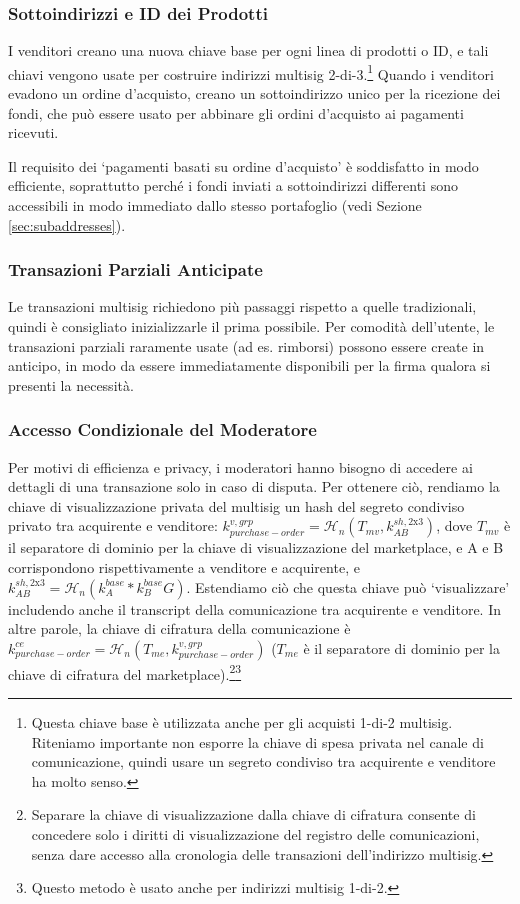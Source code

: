 \subsubsection*{Sottoindirizzi e ID dei Prodotti}

I venditori creano una nuova chiave base per ogni linea di prodotti o ID, e tali chiavi vengono usate per costruire indirizzi multisig 2-di-3.\footnote{Questa chiave base è utilizzata anche per gli acquisti 1-di-2 multisig. Riteniamo importante non esporre la chiave di spesa privata nel canale di comunicazione, quindi usare un segreto condiviso tra acquirente e venditore ha molto senso.} Quando i venditori evadono un ordine d'acquisto, creano un sottoindirizzo unico per la ricezione dei fondi, che può essere usato per abbinare gli ordini d'acquisto ai pagamenti ricevuti.

Il requisito dei `pagamenti basati su ordine d'acquisto' è soddisfatto in modo efficiente, soprattutto perché i fondi inviati a sottoindirizzi differenti sono accessibili in modo immediato dallo stesso portafoglio (vedi Sezione \ref{sec:subaddresses}).

\subsubsection*{Transazioni Parziali Anticipate}

Le transazioni multisig richiedono più passaggi rispetto a quelle tradizionali, quindi è consigliato inizializzarle il prima possibile. Per comodità dell'utente, le transazioni parziali raramente usate (ad es. rimborsi) possono essere create in anticipo, in modo da essere immediatamente disponibili per la firma qualora si presenti la necessità.

\subsubsection*{Accesso Condizionale del Moderatore}

Per motivi di efficienza e privacy, i moderatori hanno bisogno di accedere ai dettagli di una transazione solo in caso di disputa. Per ottenere ciò, rendiamo la chiave di visualizzazione privata del multisig un hash del segreto condiviso privato tra acquirente e venditore: $k^{v,grp}_{purchase-order} = \mathcal{H}_n(T_{mv},k^{sh,\textrm{2x3}}_{AB})$, dove $T_{mv}$ è il separatore di dominio per la chiave di visualizzazione del marketplace, e A e B corrispondono rispettivamente a venditore e acquirente, e $k^{sh,\textrm{2x3}}_{AB} = \mathcal{H}_n(k^{base}_{A}*k^{base}_{B} G)$. Estendiamo ciò che questa chiave può `visualizzare' includendo anche il transcript della comunicazione tra acquirente e venditore. In altre parole, la chiave di cifratura della comunicazione è $k^{ce}_{purchase-order} = \mathcal{H}_n(T_{me},k^{v,grp}_{purchase-order})$ ($T_{me}$ è il separatore di dominio per la chiave di cifratura del marketplace).\footnote{Separare la chiave di visualizzazione dalla chiave di cifratura consente di concedere solo i diritti di visualizzazione del registro delle comunicazioni, senza dare accesso alla cronologia delle transazioni dell'indirizzo multisig.}\footnote{Questo metodo è usato anche per indirizzi multisig 1-di-2.}

